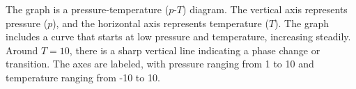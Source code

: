 The graph is a pressure-temperature (\(p\)-\(T\)) diagram. The vertical axis represents pressure (\(p\)), and the horizontal axis represents temperature (\(T\)). The graph includes a curve that starts at low pressure and temperature, increasing steadily. Around \(T = 10\), there is a sharp vertical line indicating a phase change or transition. The axes are labeled, with pressure ranging from 1 to 10 and temperature ranging from -10 to 10.